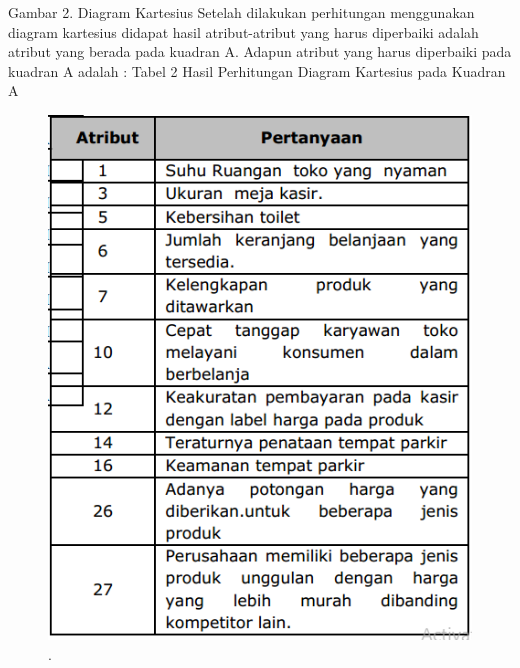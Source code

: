 Gambar 2. Diagram Kartesius
Setelah dilakukan perhitungan menggunakan diagram kartesius didapat hasil atribut-atribut yang harus diperbaiki adalah atribut yang berada pada kuadran A.
Adapun atribut yang harus diperbaiki pada kuadran A adalah :
Tabel 2 Hasil Perhitungan Diagram Kartesius pada Kuadran A	
\begin{figure}[ht]
	\centerline{\includegraphics[width=1\textwidth]{figures/rahmi5.PNG}}
	\caption{.}
	\label{rahmi5}
	\end{figure}



